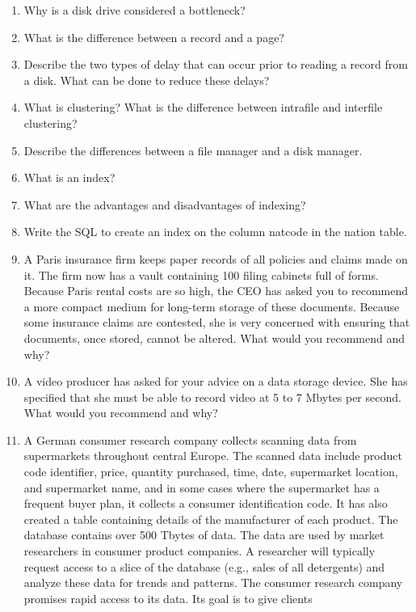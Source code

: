 \documentclass[
]{article}
\begin{document}
\begin{enumerate}
\def\labelenumi{\arabic{enumi}.}
\item
  Why is a disk drive considered a bottleneck?
\item
  What is the difference between a record and a page?
\item
  Describe the two types of delay that can occur prior to reading a
  record from a disk. What can be done to reduce these delays?
\item
  What is clustering? What is the difference between intrafile and
  interfile clustering?
\item
  Describe the differences between a file manager and a disk manager.
\item
  What is an index?
\item
  What are the advantages and disadvantages of indexing?
\item
  Write the SQL to create an index on the column natcode in the nation
  table.
\item
  A Paris insurance firm keeps paper records of all policies and
  claims made on it. The firm now has a vault containing 100 filing
  cabinets full of forms. Because Paris rental costs are so high, the
  CEO has asked you to recommend a more compact medium for long-term
  storage of these documents. Because some insurance claims are
  contested, she is very concerned with ensuring that documents, once
  stored, cannot be altered. What would you recommend and why?
\item
  A video producer has asked for your advice on a data storage device.
  She has specified that she must be able to record video at 5 to 7
  Mbytes per second. What would you recommend and why?
\item
  A German consumer research company collects scanning data from
  supermarkets throughout central Europe. The scanned data include
  product code identifier, price, quantity purchased, time, date,
  supermarket location, and supermarket name, and in some cases where
  the supermarket has a frequent buyer plan, it collects a consumer
  identification code. It has also created a table containing details
  of the manufacturer of each product. The database contains over 500
  Tbytes of data. The data are used by market researchers in consumer
  product companies. A researcher will typically request access to a
  slice of the database (e.g., sales of all detergents) and analyze
  these data for trends and patterns. The consumer research company
  promises rapid access to its data. Its goal is to give clients

\end{enumerate}
\end{document}

